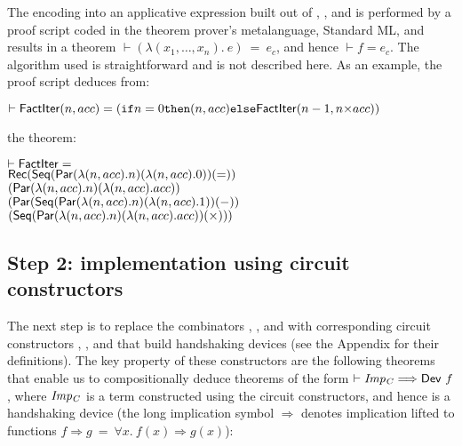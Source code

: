 \documentclass{llncs}
\begin{document}
The encoding into an applicative expression built out of ,
,  and  is performed by a proof script
coded in the theorem prover's metalanguage, Standard ML, and results
in a theorem $\vdash (\lambda(x_1,\ldots,x_n).~e)~=~e_c$, and hence
$\vdash f=e_c$.  The algorithm used is straightforward and is not
described here. As an example, the proof script deduces from:

\vspace*{-1mm}

\begin{alltt}
\( \vdash \DEF{FactIter}(n,acc) = (\texttt{if} n=0 \texttt{then} (n,acc) \texttt{else} \DEF{FactIter}(n-1,n{\times}acc)) \)
\end{alltt}

\vspace*{-1mm}

\noindent the theorem:

\vspace*{-1mm}

{\baselineskip10pt\begin{alltt}
\( \vdash \DEF{FactIter} =                                                                        \)
\(     \DEF{Rec} (\DEF{Seq} (\DEF{Par} ({\lambda}(n,acc). n) ({\lambda}(n,acc). 0)) ({=}))        \)
\(         (\DEF{Par} ({\lambda}(n,acc). n) ({\lambda}(n,acc). acc))                              \)
\(         (\DEF{Par} (\DEF{Seq} (\DEF{Par} ({\lambda}(n,acc). n) ({\lambda}(n,acc). 1)) ({-}))   \)
\(              (\DEF{Seq} (\DEF{Par} ({\lambda}(n,acc). n) ({\lambda}(n,acc). acc)) ({\times}))) \)
\end{alltt}}

\vspace*{-3mm}

\subsection*{Step 2: implementation using circuit constructors}

The next step is to replace the combinators ,
,  and  with corresponding circuit constructors
,
,  and  that build handshaking devices (see the Appendix for their definitions).
The key property of these constructors are the following theorems that
enable us to compositionally deduce theorems of the form $\vdash
{\it{Imp_C}}
\Longrightarrow \mathsf{Dev}~f$, where ${\it{Imp_C}}$ is a term
constructed using  the circuit constructors, and hence is a handshaking device
(the long implication symbol $\Longrightarrow$ denotes
implication lifted to functions
$f \Longrightarrow g~=~\forall x.~f(x)\Rightarrow g(x)$): 
\end{document}
